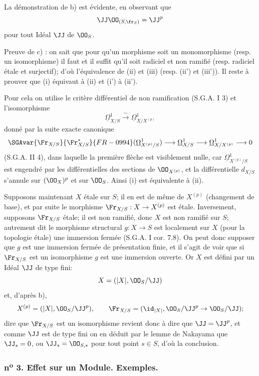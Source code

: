 La démonstration de b) est évidente, en observant que
\[
\JJ\OO_{(S,\fr_S)}=\JJ^p
\]
pour tout Idéal $\JJ$ de $\OO_S$.

Preuve de c) : on sait que pour qu'un morphisme soit un
monomorphisme (resp. un isomorphisme) il faut et il suffit qu'il soit radiciel et non ramifié (resp. radiciel étale et surjectif); d'où l'équivalence de (ii) et (iii) (resp. (ii') et (iii')). Il reste à prouver que (i) équivaut à (ii) et (i') à (ii').

Pour cela on utilise le critère différentiel de non ramification (S.G.A. I 3) et l'isomorphisme
\[
\underline{\Omega}^1_{X/S}\xrightarrow{\sim} \underline{\Omega}^1_{X/X^{(p)}}
\]
donné par la suite exacte canonique
\[
\SGAvar{\Fr_{X/S}}{\Fr_{X/S}^*}{FR-0994}(\underline{\Omega}^1_{X^{(p)}/S})\longrightarrow \underline{\Omega}^1_{X/S}
\longrightarrow \underline{\Omega}^1_{X/X^{(p)}}\longrightarrow 0
\]
(S.G.A. II 4), dans laquelle la première flèche est visiblement nulle, car $\underline{\Omega}^1_{X^{(p)}/S}$ est engendré par les différentielles des sections de $\OO_{X^{(p)}}$, et la différentielle $d_{X/S}$ s'annule sur $(\OO_X)^p$ et sur $\OO_S$. Ainsi (i) est équivalente à (ii).

Supposons maintenant $X$ étale sur $S$; il en est de même de $X^{(p)}$ (changement de base), et par suite le morphisme $\Fr_{X/S}:X\to X^{(p)}$ est étale. Inversement, supposons $\Fr_{X/S}$ étale; il est non ramifié, donc $X$ est non ramifié sur $S$; autrement dit le morphisme structural $g:X\to S$ est localement sur $X$ (pour la topologie étale) une immersion fermée (S.G.A. I cor. 7.8). On peut donc supposer que $g$ est une immersion fermée de présentation finie, et il s'agit de voir que si $\Fr_{X/S}$ est un isomorphisme $g$ est une immersion ouverte. Or $X$ est défini par un Idéal $\JJ$ de type fini:
\[
X=(|X|,\OO_S/\JJ)
\]
et, d'après b),
\[
X^{(p)}=(|X|,\OO_S/\JJ^p),
\qquad
\Fr_{X/S}=(\id_{|X|},\OO_S/\JJ^p\to\OO_S/\JJ);
\]
dire que $\Fr_{X/S}$ est un isomorphisme revient donc à dire que $\JJ=\JJ^p$, et comme $\JJ$ est de type fini on en déduit par le lemme de Nakayama que $\JJ_s=0$, ou $\JJ_s=\OO_{S,s}$ pour tout point $s\in S$, d'où la conclusion.

\subsubsection*{n\textsuperscript{o} 3. Effet sur un Module. Exemples.}

